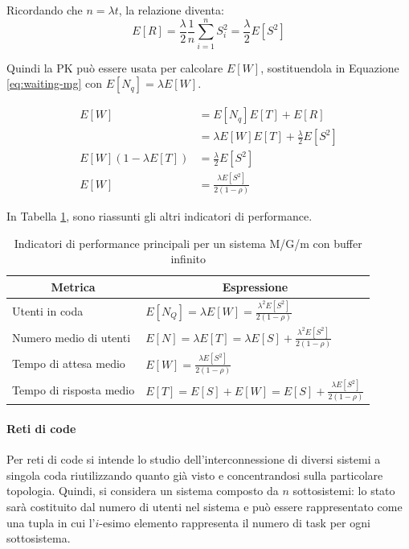 \documentclass{article}
\begin{document}
Ricordando che $n=\lambda t$, la relazione diventa:
\[
  E[R] = \frac{\lambda}{2}\frac{1}{n}\sum_{i=1}^n S_i^2 = \frac{\lambda}{2}E[S^2]
\]

Quindi la PK può essere usata per calcolare $E[W]$, sostituendola in Equazione 
\ref{eq:waiting-mg} con $E[N_q] = \lambda E[W]$.

\begin{align*}
  E[W] &= E[N_q]E[T] + E[R] \\ 
  &= \lambda E[W]E[T] + \frac{\lambda}{2}E[S^2]\\
  E[W] (1-\lambda E[T]) &= \frac{\lambda}{2}E[S^2]\\
  E[W] &= \frac{\lambda E[S^2]}{2(1-\rho)}
\end{align*}

In Tabella \ref{tab:mg-perf}, sono riassunti gli altri indicatori di performance.
\begin{table}
  \begin{center}
    \begin{tabular}[c]{l|l}
      \hline
      \multicolumn{1}{c|}{\textbf{Metrica}} & 
      \multicolumn{1}{c}{\textbf{Espressione}} \\
      \hline
      Utenti in coda & $E[N_Q] =\lambda E[W] = \frac{\lambda^2 E[S^2]}{2(1-\rho)}$\\[2ex]
      Numero medio di utenti & $ E[N] = \lambda E[T] = \lambda E[S] + \frac{\lambda^2 E[S^2]}
      {2(1-\rho)}$ \\[2ex]
      Tempo di attesa medio & $E[W] = \frac{\lambda E[S^2]}{2(1-\rho)}$\\[2ex]
      Tempo di risposta medio & $E[T] = E[S] +E[W] = E[S]+\frac{\lambda E[S^2]}{2(1-\rho)}$\\[2ex]
      \hline
    \end{tabular}
  \end{center}
  \caption{Indicatori di performance principali per un sistema M/G/m con buffer infinito}
  \label{tab:mg-perf}
\end{table}

\paragraph{Reti di code}Per reti di code si intende lo studio dell'interconnessione di 
diversi sistemi a singola coda riutilizzando quanto già visto e concentrandosi sulla
particolare topologia. Quindi, si considera un sistema composto da $n$ sottosistemi: lo stato
sarà costituito dal numero di utenti nel sistema e può essere rappresentato come una tupla in 
cui l'$i$-esimo elemento rappresenta il numero di task per ogni sottosistema.
\end{document}
